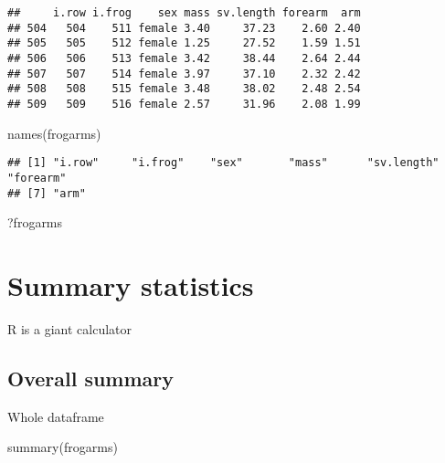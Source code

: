 \documentclass[
]{book}
\newenvironment{Shaded}{\begin{snugshade}}{\end{snugshade}}
\newcommand{\FunctionTok}[1]{\textcolor[rgb]{0.00,0.00,0.00}{#1}}
\newcommand{\NormalTok}[1]{#1}
\begin{document}
\begin{verbatim}
##     i.row i.frog    sex mass sv.length forearm  arm
## 504   504    511 female 3.40     37.23    2.60 2.40
## 505   505    512 female 1.25     27.52    1.59 1.51
## 506   506    513 female 3.42     38.44    2.64 2.44
## 507   507    514 female 3.97     37.10    2.32 2.42
## 508   508    515 female 3.48     38.02    2.48 2.54
## 509   509    516 female 2.57     31.96    2.08 1.99
\end{verbatim}

\begin{Shaded}
\begin{Highlighting}[]
\FunctionTok{names}\NormalTok{(frogarms)}
\end{Highlighting}
\end{Shaded}

\begin{verbatim}
## [1] "i.row"     "i.frog"    "sex"       "mass"      "sv.length" "forearm"  
## [7] "arm"
\end{verbatim}

\begin{Shaded}
\begin{Highlighting}[]
\NormalTok{?frogarms}
\end{Highlighting}
\end{Shaded}

\hypertarget{summary-statistics-2}{%
\section{Summary statistics}\label{summary-statistics-2}}

R is a giant calculator

\hypertarget{overall-summary}{%
\subsection{Overall summary}\label{overall-summary}}

Whole dataframe

\begin{Shaded}
\begin{Highlighting}[]
\FunctionTok{summary}\NormalTok{(frogarms)}
\end{Highlighting}
\end{Shaded}
\end{document}
